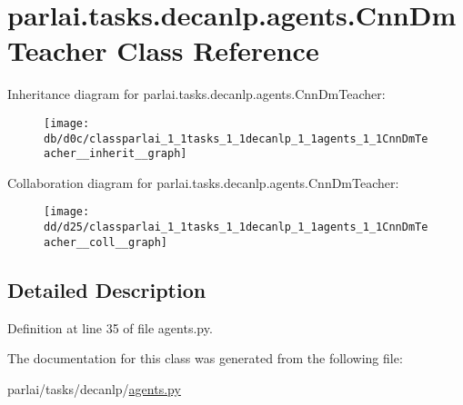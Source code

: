 \hypertarget{classparlai_1_1tasks_1_1decanlp_1_1agents_1_1CnnDmTeacher}{}\section{parlai.\+tasks.\+decanlp.\+agents.\+Cnn\+Dm\+Teacher Class Reference}
\label{classparlai_1_1tasks_1_1decanlp_1_1agents_1_1CnnDmTeacher}


Inheritance diagram for parlai.\+tasks.\+decanlp.\+agents.\+Cnn\+Dm\+Teacher\+:\nopagebreak
\begin{figure}[H]
\begin{center}
\leavevmode
\texttt{[image: db/d0c/classparlai\_1\_1tasks\_1\_1decanlp\_1\_1agents\_1\_1CnnDmTeacher\_\_inherit\_\_graph]}
\end{center}
\end{figure}


Collaboration diagram for parlai.\+tasks.\+decanlp.\+agents.\+Cnn\+Dm\+Teacher\+:\nopagebreak
\begin{figure}[H]
\begin{center}
\leavevmode
\texttt{[image: dd/d25/classparlai\_1\_1tasks\_1\_1decanlp\_1\_1agents\_1\_1CnnDmTeacher\_\_coll\_\_graph]}
\end{center}
\end{figure}


\subsection{Detailed Description}


Definition at line 35 of file agents.\+py.



The documentation for this class was generated from the following file\+:\begin{DoxyCompactItemize}
\item 
parlai/tasks/decanlp/\hyperlink{parlai_2tasks_2decanlp_2agents_8py}{agents.\+py}\end{DoxyCompactItemize}
